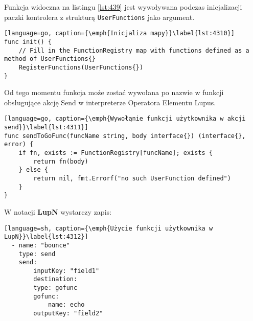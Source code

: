 Funkcja widoczna na listingu \ref{lst:439} jest wywoływana podczas inicjalizacji paczki kontrolera z strukturą \texttt{UserFunctions} jako argument.

\begin{lstlisting}[language=go, caption={\emph{Inicjaliza mapy}}\label{lst:4310}]
func init() {
    // Fill in the FunctionRegistry map with functions defined as a method of UserFunctions{}
	RegisterFunctions(UserFunctions{})
}
\end{lstlisting}


Od tego momentu funkcja może zostać wywołana po nazwie w funkcji obsługujące akcję Send w interpreterze Operatora Elementu Lupus.

\begin{lstlisting}[language=go, caption={\emph{Wywołąnie funkcji użytkownika w akcji send}}\label{lst:4311}]
func sendToGoFunc(funcName string, body interface{}) (interface{}, error) {
	if fn, exists := FunctionRegistry[funcName]; exists {
		return fn(body)
	} else {
		return nil, fmt.Errorf("no such UserFunction defined")
	}
}
\end{lstlisting}

W notacji \textbf{LupN} wystarczy zapis:

\begin{lstlisting}[language=sh, caption={\emph{Użycie funkcji użytkownika w LupN}}\label{lst:4312}]
  - name: "bounce"
    type: send
    send:
        inputKey: "field1"
        destination:
        type: gofunc
        gofunc:
            name: echo
        outputKey: "field2"
\end{lstlisting}